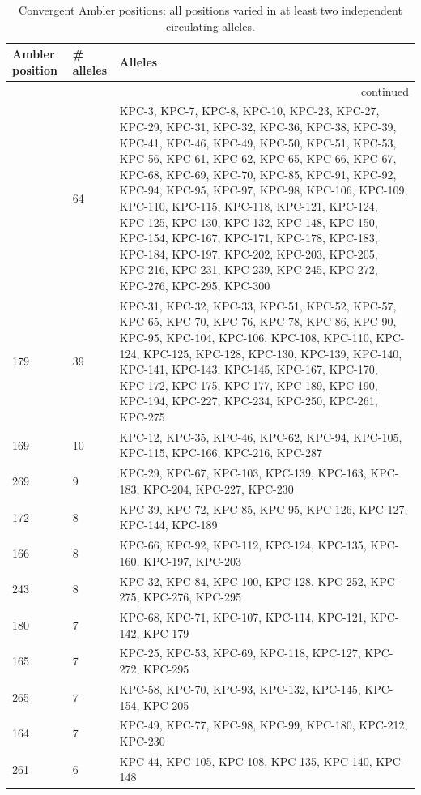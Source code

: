 \small\begin{longtable}{llp{9cm}}
\caption{Convergent Ambler positions: all positions varied in at least two independent circulating alleles.}\\
\hline Ambler position & \# alleles & Alleles \\\hline\endhead
\hline \multicolumn{3}{r}{continued}\\\endfoot
\hline\endlastfoot
274 & 64 & KPC-3, KPC-7, KPC-8, KPC-10, KPC-23, KPC-27, KPC-29, KPC-31, KPC-32, KPC-36, KPC-38, KPC-39, KPC-41, KPC-46, KPC-49, KPC-50, KPC-51, KPC-53, KPC-56, KPC-61, KPC-62, KPC-65, KPC-66, KPC-67, KPC-68, KPC-69, KPC-70, KPC-85, KPC-91, KPC-92, KPC-94, KPC-95, KPC-97, KPC-98, KPC-106, KPC-109, KPC-110, KPC-115, KPC-118, KPC-121, KPC-124, KPC-125, KPC-130, KPC-132, KPC-148, KPC-150, KPC-154, KPC-167, KPC-171, KPC-178, KPC-183, KPC-184, KPC-197, KPC-202, KPC-203, KPC-205, KPC-216, KPC-231, KPC-239, KPC-245, KPC-272, KPC-276, KPC-295, KPC-300 \\
179 & 39 & KPC-31, KPC-32, KPC-33, KPC-51, KPC-52, KPC-57, KPC-65, KPC-70, KPC-76, KPC-78, KPC-86, KPC-90, KPC-95, KPC-104, KPC-106, KPC-108, KPC-110, KPC-124, KPC-125, KPC-128, KPC-130, KPC-139, KPC-140, KPC-141, KPC-143, KPC-145, KPC-167, KPC-170, KPC-172, KPC-175, KPC-177, KPC-189, KPC-190, KPC-194, KPC-227, KPC-234, KPC-250, KPC-261, KPC-275 \\
169 & 10 & KPC-12, KPC-35, KPC-46, KPC-62, KPC-94, KPC-105, KPC-115, KPC-166, KPC-216, KPC-287 \\
269 & 9 & KPC-29, KPC-67, KPC-103, KPC-139, KPC-163, KPC-183, KPC-204, KPC-227, KPC-230 \\
172 & 8 & KPC-39, KPC-72, KPC-85, KPC-95, KPC-126, KPC-127, KPC-144, KPC-189 \\
166 & 8 & KPC-66, KPC-92, KPC-112, KPC-124, KPC-135, KPC-160, KPC-197, KPC-203 \\
243 & 8 & KPC-32, KPC-84, KPC-100, KPC-128, KPC-252, KPC-275, KPC-276, KPC-295 \\
180 & 7 & KPC-68, KPC-71, KPC-107, KPC-114, KPC-121, KPC-142, KPC-179 \\
165 & 7 & KPC-25, KPC-53, KPC-69, KPC-118, KPC-127, KPC-272, KPC-295 \\
265 & 7 & KPC-58, KPC-70, KPC-93, KPC-132, KPC-145, KPC-154, KPC-205 \\
164 & 7 & KPC-49, KPC-77, KPC-98, KPC-99, KPC-180, KPC-212, KPC-230 \\
261 & 6 & KPC-44, KPC-105, KPC-108, KPC-135, KPC-140, KPC-148 \\

\end{longtable}
